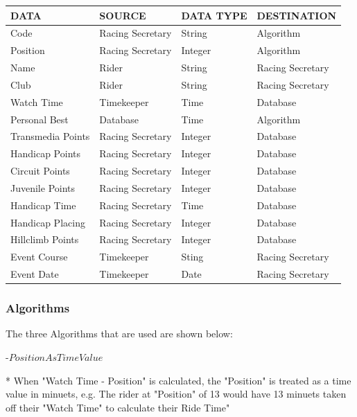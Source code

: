 \begin{tabular}{|l|l|l|l|}


\hline
DATA & SOURCE & DATA TYPE & DESTINATION \\ \hline
Code & Racing Secretary & String & Algorithm \\ \hline
Position & Racing Secretary & Integer & Algorithm \\ \hline
Name & Rider & String & Racing Secretary \\ \hline
Club & Rider & String & Racing Secretary \\ \hline
Watch Time & Timekeeper & Time & Database \\ \hline
Personal Best & Database & Time & Algorithm \\ \hline
Transmedia Points & Racing Secretary & Integer & Database \\ \hline
Handicap Points & Racing Secretary & Integer & Database \\ \hline
Circuit Points & Racing Secretary & Integer & Database \\ \hline
Juvenile Points & Racing Secretary & Integer & Database \\ \hline
Handicap Time & Racing Secretary & Time & Database \\ \hline
Handicap Placing & Racing Secretary & Integer & Database \\ \hline
Hillclimb Points & Racing Secretary & Integer & Database \\ \hline
Event Course & Timekeeper & Sting & Racing Secretary \\ \hline
Event Date & Timekeeper & Date & Racing Secretary \\ \hline

\end{tabular}

\subsubsection{Algorithms}
The three Algorithms that are used are shown below:

\begin{algorithm}[H]
\label{fig:Ride Time Algorithm}
	\caption{$Ride Time Algorithum$}
\begin{algorithmic}[1]
-{$PositionAsTimeValue$}
\end{algorithmic}
\end{algorithm}


* When "Watch Time - Position" is calculated, the "Position" is treated as a time value in minuets, e.g. The rider at "Position" of 13 would have 13 minuets taken off their "Watch Time" to calculate their Ride Time"


